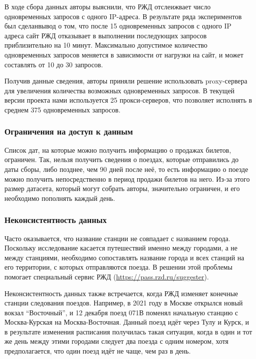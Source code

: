 \documentclass[conference]{IEEEtran}
\begin{document}
В ходе сбора данных авторы выяснили, что РЖД отслеижвает число одновременных запросов с одного IP-адреса. В результате ряда экспериментов был сделанвывод о том, что после 15 одновременных запросов с одного IP адреса сайт РЖД отказывает в выполнении последующих запросов приблизительно на 10 минут. Максимально допустимое количество одновременных запросов меняется в зависимости от нагрузки на сайт, и может составлять от 10 до 30 запросов.

Получив данные сведения, авторы приняли решение использовать proxy-сервера для увеличения количества возможных одновременных запросов. В текущей версии проекта нами используется 25 прокси-серверов, что позволяет исполнять в среднем 375 одновременных запросов.

\subsubsection{Ограничения на доступ к данным}
Список дат, на которые можно получить информацию о продажах билетов, ограничен. Так, нельзя получить сведения о поездах, которые отправились до даты сборы, либо позднее, чем 90 дней после неё, то есть информацию о поезде можно получить непосредственно в период продажи билетов на него. Из-за этого размер датасета, который могут собрать авторы, значительно ограничен, и его необходимо пополнять каждый день.


\subsubsection{Неконсистентность данных}
Часто оказывается, что название станции не совпадает с названием города. Поскольку исследование касается путешествий именно между городами, а не между станциями, необходимо сопоставлять название города и всех станций на его территории, с которых отправляются поезда. В решении этой проблемы помогает специальный сервис РЖД (\href{https://pass.rzd.ru/suggester}{https://pass.rzd.ru/suggester}). 

Неконсистентность данных также встречается, когда РЖД изменяет конечные станции следования поездов. Например, в 2021 году в Москве открылся новый вокзал ``Восточный'', и 12 декабря поезд 071В поменял начальную станцию с Москва-Курская на Москва-Восточная. Данный поезд идёт через Тулу и Курск, и в результате изменения расписания получилась такая ситуация, когда в один и тот же день между этими городами следует два поезда с одним номером, хотя предполагается, что один поезд идёт не чаще, чем раз в день.
\end{document}

